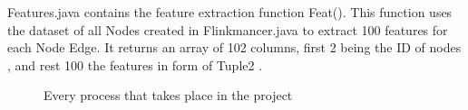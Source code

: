 Features.java contains the feature extraction function Feat(). This function uses the dataset of all Nodes created in Flinkmancer.java to extract 100 features for each Node Edge. It returns an array of 102 columns, first 2 being the ID of nodes , and rest 100 the features in form of Tuple2 .
\begin{figure}[ht]
\noindent{}
\caption{Every process that takes place in the project}
\label{fig:graph}
\end{figure}
